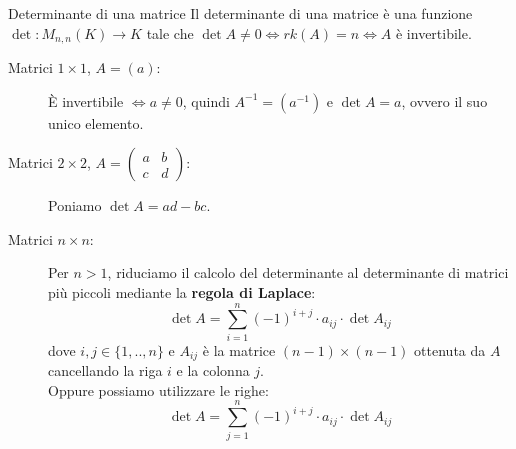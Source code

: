 \documentclass[a4paper]{article}
\theoremstyle{definition}
\begin{document}
\begin{deff}{Determinante di una matrice}{}
	Il determinante di una matrice è una funzione $\det: M_{n,n}(K) \rightarrow K$ tale che $\det A \ne 0 \Leftrightarrow rk(A) = n \Leftrightarrow A$ è invertibile.
	\begin{description}
		\item[Matrici $1 \times 1$, $A = (a)$:]
			È invertibile $\Leftrightarrow a \ne 0$, quindi $A^{-1} = (a^{-1})$ e \underline{$\det A = a$}, ovvero il suo unico elemento.
		\item[Matrici $2 \times 2$, $A = \begin{pmatrix}
			a & b \\
			c & d
		\end{pmatrix}$:] Poniamo \underline{$\det A = ad - bc$}.
		      
		\item[Matrici $n \times n$:] Per $n > 1$, riduciamo il calcolo del determinante al determinante di matrici più piccoli mediante la \textbf{regola di Laplace}:
		      \begin{equation*}
			      \det A = \sum_{i = 1}^{n} (-1)^{i + j} \cdot a_{ij} \cdot \det A_{ij}
		      \end{equation*}
		      dove $i, j \in \{1, .., n\}$ e $A_{ij}$ è la matrice $(n - 1) \times (n - 1)$ ottenuta da $A$ cancellando la riga $i$ e la colonna $j$. \\
			  Oppure possiamo utilizzare le righe:
			  \begin{equation*}
				  \det A = \sum_{j = 1}^{n} (-1)^{i + j} \cdot a_{ij} \cdot \det A_{ij}
				\end{equation*}
	\end{description}
\end{deff}
\end{document}
